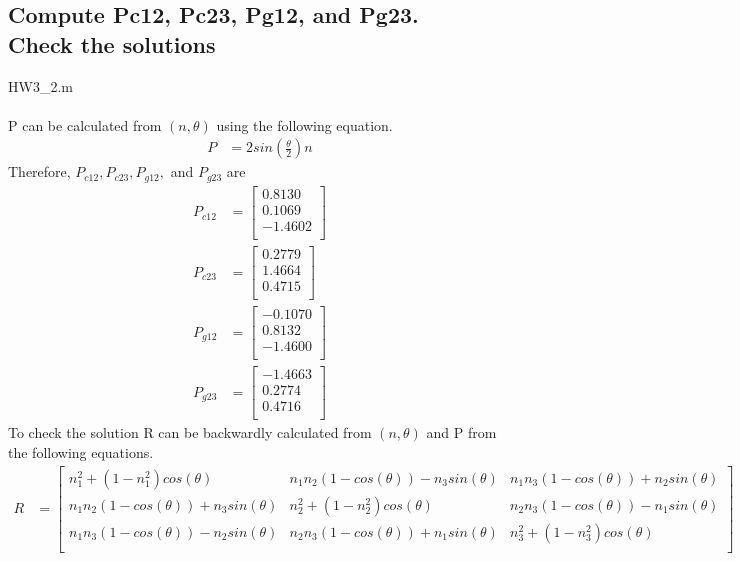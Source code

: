 \documentclass[]{article}
\begin{document}
\subsection{Compute Pc12, Pc23, Pg12, and Pg23.\\ Check the solutions}
HW3\_2.m\\
\\
\indent P can be calculated from $(n, \theta)$ using the following equation.
\begin{align*}
P &= 2sin\left(\frac{\theta}{2}\right)n
\end{align*}
\indent Therefore, $P_{c12}, P_{c23}, P_{g12},$ and $P_{g23}$ are
\begin{align*}
P_{c12} &=
\begin{bmatrix}
0.8130\\
0.1069\\
-1.4602\\
\end{bmatrix}\\
P_{c23} &=
\begin{bmatrix}
0.2779\\
1.4664\\
0.4715\\
\end{bmatrix}\\
P_{g12} &=
\begin{bmatrix}
-0.1070\\
0.8132\\
-1.4600\\
\end{bmatrix}\\
P_{g23} &=
\begin{bmatrix}
-1.4663\\
0.2774\\
0.4716\\
\end{bmatrix}
\end{align*}
\indent To check the solution R can be backwardly calculated from $(n,\theta)$ and P from the following equations.
\begin{align*}
R &= 
\begin{bmatrix}
n_1^2 + (1-n_1^2)cos(\theta) & n_1n_2(1-cos(\theta))-n_3sin(\theta) & n_1n_3(1-cos(\theta))+n_2sin(\theta) \\
n_1n_2(1-cos(\theta))+n_3sin(\theta)   & n_2^2+(1-n_2^2)cos(\theta)  & n_2n_3(1-cos(\theta))-n_1sin(\theta) \\
n_1n_3(1-cos(\theta))-n_2sin(\theta)   & n_2n_3(1-cos(\theta))+n_1sin(\theta) & n_3^2+(1-n_3^2)cos(\theta) \\
\end{bmatrix}
\end{align*}
\end{document}
